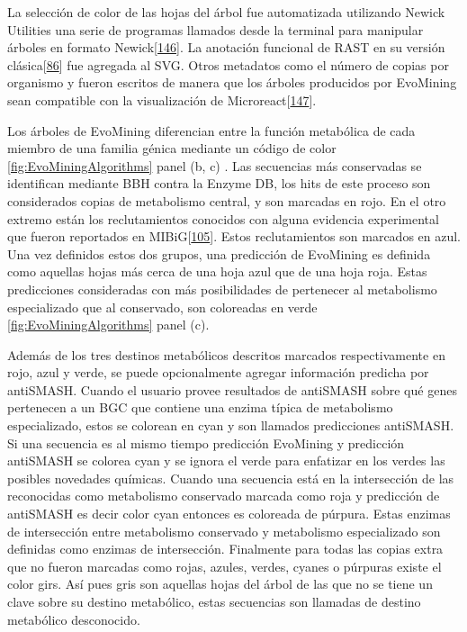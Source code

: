 \documentclass[12pt,twoside]{reedthesis}
\begin{document}
  La selección de color de las hojas del árbol fue automatizada utilizando
  Newick Utilities una serie de programas llamados desde la terminal para
  manipular árboles en formato
  Newick{[}\protect\hyperlink{ref-junier_newick_2010}{146}{]}. La
  anotación funcional de RAST en su versión
  clásica{[}\protect\hyperlink{ref-aziz_rast_2008}{86}{]} fue agregada al
  SVG. Otros metadatos como el número de copias por organismo y fueron
  escritos de manera que los árboles producidos por EvoMining sean
  compatible con la visualización de
  Microreact{[}\protect\hyperlink{ref-argimon_microreact_2016}{147}{]}.
  
  Los árboles de EvoMining diferencian entre la función metabólica de cada
  miembro de una familia génica mediante un código de color
  \autoref{fig:EvoMiningAlgorithms} panel (b, c) . Las secuencias más
  conservadas se identifican mediante BBH contra la Enzyme DB, los hits de
  este proceso son considerados copias de metabolismo central, y son
  marcadas en rojo. En el otro extremo están los reclutamientos conocidos
  con alguna evidencia experimental que fueron reportados en
  MIBiG{[}\protect\hyperlink{ref-medema_minimum_2015}{105}{]}. Estos
  reclutamientos son marcados en azul. Una vez definidos estos dos grupos,
  una predicción de EvoMining es definida como aquellas hojas más cerca de
  una hoja azul que de una hoja roja. Estas predicciones consideradas con
  más posibilidades de pertenecer al metabolismo especializado que al
  conservado, son coloreadas en verde \autoref{fig:EvoMiningAlgorithms}
  panel (c).
  
  Además de los tres destinos metabólicos descritos marcados
  respectivamente en rojo, azul y verde, se puede opcionalmente agregar
  información predicha por antiSMASH. Cuando el usuario provee resultados
  de antiSMASH sobre qué genes pertenecen a un BGC que contiene una enzima
  típica de metabolismo especializado, estos se colorean en cyan y son
  llamados predicciones antiSMASH. Si una secuencia es al mismo tiempo
  predicción EvoMining y predicción antiSMASH se colorea cyan y se ignora
  el verde para enfatizar en los verdes las posibles novedades químicas.
  Cuando una secuencia está en la intersección de las reconocidas como
  metabolismo conservado marcada como roja y predicción de antiSMASH es
  decir color cyan entonces es coloreada de púrpura. Estas enzimas de
  intersección entre metabolismo conservado y metabolismo especializado
  son definidas como enzimas de intersección. Finalmente para todas las
  copias extra que no fueron marcadas como rojas, azules, verdes, cyanes o
  púrpuras existe el color girs. Así pues gris son aquellas hojas del
  árbol de las que no se tiene un clave sobre su destino metabólico, estas
  secuencias son llamadas de destino metabólico desconocido.
  
\end{document}
